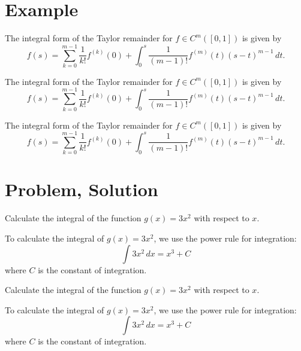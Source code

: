 \documentclass{article}
\begin{document}
\section{Example}

\begin{example}
    The integral form of the Taylor remainder for $f \in C^m([0,1])$ is given by
    \begin{equation*}
        f(s) = \sum_{k=0}^{m-1}\frac{1}{k!} f^{(k)}(0) + \int_0^s \frac{1}{(m-1)!} f^{(m)}(t)(s-t)^{m-1}\,dt.
    \end{equation*}
\end{example}

\begin{example}[xxx]
    The integral form of the Taylor remainder for $f \in C^m([0,1])$ is given by
    \begin{equation*}
        f(s) = \sum_{k=0}^{m-1}\frac{1}{k!} f^{(k)}(0) + \int_0^s \frac{1}{(m-1)!} f^{(m)}(t)(s-t)^{m-1}\,dt.
    \end{equation*}
\end{example}

\begin{example*}
    The integral form of the Taylor remainder for $f \in C^m([0,1])$ is given by
    \begin{equation*}
        f(s) = \sum_{k=0}^{m-1}\frac{1}{k!} f^{(k)}(0) + \int_0^s \frac{1}{(m-1)!} f^{(m)}(t)(s-t)^{m-1}\,dt.
    \end{equation*}
\end{example*}

\section{Problem, Solution}

\begin{problem}
Calculate the integral of the function $g(x) = 3x^2$ with respect to $x$.
\end{problem}

\begin{solution}
    To calculate the integral of $g(x) = 3x^2$, we use the power rule for integration:
    \[
        \int 3x^2 \, dx = x^3 + C
    \]
    where $C$ is the constant of integration.
\end{solution}

\begin{problem}[xxx]
Calculate the integral of the function $g(x) = 3x^2$ with respect to $x$.
\end{problem}
\begin{solution}[xxx]
    To calculate the integral of $g(x) = 3x^2$, we use the power rule for integration:
    \[
        \int 3x^2 \, dx = x^3 + C
    \]
    where $C$ is the constant of integration.
\end{solution}
\end{document}
